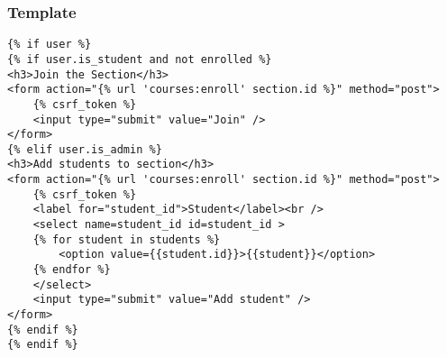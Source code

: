 \documentclass{beamer}
\begin{document}
\begin{frame}[fragile]
\frametitle{Template}

\begin{lstlisting}[basicstyle=\tiny]
{% if user %}
{% if user.is_student and not enrolled %}
<h3>Join the Section</h3>
<form action="{% url 'courses:enroll' section.id %}" method="post">
    {% csrf_token %}
    <input type="submit" value="Join" />
</form>
{% elif user.is_admin %}
<h3>Add students to section</h3>
<form action="{% url 'courses:enroll' section.id %}" method="post">
    {% csrf_token %}
    <label for="student_id">Student</label><br />
    <select name=student_id id=student_id >
    {% for student in students %}
        <option value={{student.id}}>{{student}}</option>
    {% endfor %}
    </select>
    <input type="submit" value="Add student" />
</form>
{% endif %}
{% endif %}  
\end{lstlisting}
\end{frame}
\end{document}
